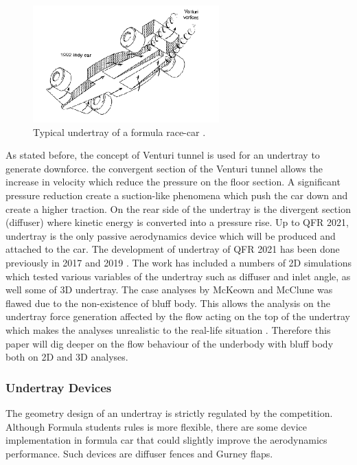\begin{figure}[!ht]
    \centering
    \includegraphics[height=4.5cm]{Figures/underbody.PNG}
    \caption{Typical undertray of a formula race-car \cite{Katz1995RaceSpeed}.}
    \label{fig:underbody}
\end{figure}

\noindent As stated before, the concept of Venturi tunnel is used for an undertray to generate downforce. the convergent section of the Venturi tunnel allows the increase in velocity which reduce the pressure on the floor section. A significant pressure reduction create a suction-like phenomena which push the car down and create a higher traction. On the rear side of the undertray is the divergent section (diffuser) where kinetic energy is converted into a pressure rise. 
\noindent Up to QFR 2021, undertray is the only passive aerodynamics device which will be produced and attached to the car. The development of undertray of QFR 2021 has been done previously in 2017 \cite{McKeown2018DesignCar} and 2019 \cite{McClune2018DesignCar}. The work has included a numbers of 2D simulations which tested various variables of the undertray such as diffuser and inlet angle, as well some of 3D undertray. The case analyses by McKeown \cite{McKeown2018DesignCar} and McClune \cite{McClune2018DesignCar} was flawed due to the non-existence of bluff body. This allows the analysis on the undertray force generation affected by the flow acting on the top of the undertray which makes the analyses unrealistic to the real-life situation \cite{Corr2017MechanicalAuthor}. Therefore this paper will dig deeper on the flow behaviour of the underbody with bluff body both on 2D and 3D analyses. 

\subsubsection{Undertray Devices}
The geometry design of an undertray is strictly regulated by the competition. Although Formula students rules is more flexible, there are some device implementation in formula car that could slightly improve the aerodynamics performance. Such devices are diffuser fences and Gurney flaps.


